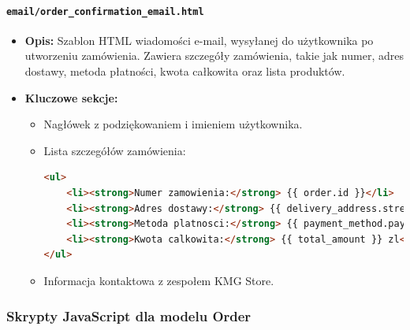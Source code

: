 \documentclass[12pt,a4paper,oneside]{article}
\theoremstyle{definition}
\numberwithin{equation}{section}
\begin{document}
\paragraph{\texttt{email/order\_confirmation\_email.html}}
\begin{itemize}
    \item \textbf{Opis:} Szablon HTML wiadomości e-mail, wysyłanej do użytkownika po utworzeniu zamówienia. Zawiera szczegóły zamówienia, takie jak numer, adres dostawy, metoda płatności, kwota całkowita oraz lista produktów.
    \item \textbf{Kluczowe sekcje:}
    \begin{itemize}
        \item Nagłówek z podziękowaniem i imieniem użytkownika.
        \item Lista szczegółów zamówienia:
        \begin{lstlisting}[language=HTML]
<ul>
    <li><strong>Numer zamowienia:</strong> {{ order.id }}</li>
    <li><strong>Adres dostawy:</strong> {{ delivery_address.street }}, {{ delivery_address.city }}</li>
    <li><strong>Metoda platnosci:</strong> {{ payment_method.payment_method }}</li>
    <li><strong>Kwota calkowita:</strong> {{ total_amount }} zl</li>
</ul>
        \end{lstlisting}
        \item Informacja kontaktowa z zespołem KMG Store.
    \end{itemize}
\end{itemize}

\subsubsection{Skrypty JavaScript dla modelu Order}
\end{document}
